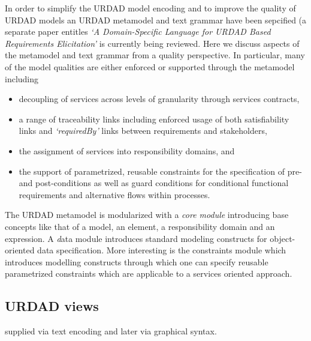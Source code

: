In order to simplify the URDAD model encoding and to improve the quality of URDAD models an URDAD metamodel and text grammar have been sepcified (a separate paper entitles \emph{`A Domain-Specific Language for URDAD Based Requirements Elicitation'} is currently being reviewed. Here we discuss aspects of the metamodel and text grammar from a quality perspective. In particular, many of the model qualities are either enforced or supported through the metamodel including
\begin{itemize}
 \item decoupling of services across levels of granularity through services contracts,
 \item a range of traceability links including enforced usage of both satisfiability links and \emph{`requiredBy'} links between requirements and stakeholders,
 \item the assignment of services into responsibility domains, and 
 \item the support of parametrized, reusable constraints for the specification of pre- and post-conditions as well as guard conditions for conditional functional requirements and alternative flows within processes.
\end{itemize}

The URDAD metamodel is modularized with a \emph{core module} introducing base concepts like that of a model, an element, a responsibility domain and an expression. A {\emph data module} introduces standard modeling constructs for object-oriented data specification. More interesting is the constraints module which introduces modelling constructs through which one can specify reusable parametrized constraints which are applicable to a services oriented approach.




\subsection{URDAD views}
\label{sec:urdadViews}

supplied via text encoding and later via graphical syntax.



